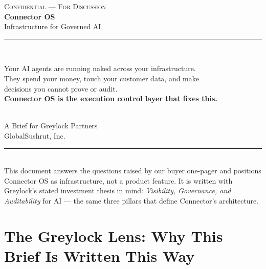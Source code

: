 \documentclass[11pt,a4paper]{article}
\begin{document}
\setlength{\parindent}{0pt}
\setlength{\parskip}{6pt}

\begin{titlepage}
\pagecolor{CNavy}\color{white}
\vspace*{1.8cm}
\begin{center}
  {\fontsize{10}{12}\selectfont\scshape\color{white!60} Confidential — For Discussion}\\[0.9cm]
  {\fontsize{42}{50}\selectfont\bfseries Connector OS}\\[0.3cm]
  {\fontsize{18}{22}\selectfont\color{white!85} Infrastructure for Governed AI}\\[1.4cm]
  \textcolor{white!25}{\rule{0.65\textwidth}{0.5pt}}\\[1.4cm]
  \begin{minipage}{0.82\textwidth}\centering
    \colorbox{white!10}{%
      \parbox{0.9\textwidth}{\centering\large\color{white}
        Your AI agents are running naked across your infrastructure.\\[8pt]
        They spend your money, touch your customer data, and make\\
        decisions you cannot prove or audit.\\[12pt]
        \textbf{Connector OS is the execution control layer that fixes this.}
      }
    }
  \end{minipage}\\[1.8cm]
  {\large\color{white!75} A Brief for Greylock Partners}\\[0.3cm]
  {\normalsize\color{white!55} GlobalSushrut, Inc. \enspace\textbullet{}}
\end{center}
\vfill
\noindent\textcolor{white!20}{\rule{\textwidth}{0.4pt}}\\[4pt]
{\footnotesize\color{white!50}
  This document answers the questions raised by our buyer one-pager and positions Connector OS
  as infrastructure, not a product feature. It is written with Greylock's stated investment
  thesis in mind: \emph{Visibility, Governance, and Auditability} for AI — the same
  three pillars that define Connector's architecture.
}
\end{titlepage}
\nopagecolor\color{black}

\tableofcontents
\clearpage

\section{The Greylock Lens: Why This Brief Is Written This Way}
\label{sec:greylock-lens}
\end{document}
